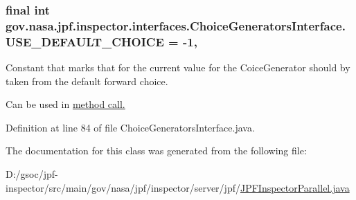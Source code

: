 \subsubsection[{\texorpdfstring{U\+S\+E\+\_\+\+D\+E\+F\+A\+U\+L\+T\+\_\+\+C\+H\+O\+I\+CE}{USE_DEFAULT_CHOICE}}]{\setlength{\rightskip}{0pt plus 5cm}final int gov.\+nasa.\+jpf.\+inspector.\+interfaces.\+Choice\+Generators\+Interface.\+U\+S\+E\+\_\+\+D\+E\+F\+A\+U\+L\+T\+\_\+\+C\+H\+O\+I\+CE = -\/1\hspace{0.3cm}{\ttfamily [static]}, {\ttfamily [inherited]}}\hypertarget{interfacegov_1_1nasa_1_1jpf_1_1inspector_1_1interfaces_1_1_choice_generators_interface_ac57a2bb0eb101be2c2b27bd19cb81ea7}{}\label{interfacegov_1_1nasa_1_1jpf_1_1inspector_1_1interfaces_1_1_choice_generators_interface_ac57a2bb0eb101be2c2b27bd19cb81ea7}


Constant that marks that for the current value for the Coice\+Generator should by taken from the default forward choice. 

Can be used in \hyperlink{interfacegov_1_1nasa_1_1jpf_1_1inspector_1_1interfaces_1_1_choice_generators_interface_a055b8d48f863633614dee147bc607ed7}{method call. }

Definition at line 84 of file Choice\+Generators\+Interface.\+java.



The documentation for this class was generated from the following file\+:\begin{DoxyCompactItemize}
\item 
D\+:/gsoc/jpf-\/inspector/src/main/gov/nasa/jpf/inspector/server/jpf/\hyperlink{_j_p_f_inspector_parallel_8java}{J\+P\+F\+Inspector\+Parallel.\+java}\end{DoxyCompactItemize}
